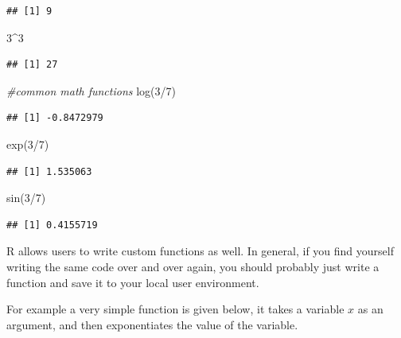 \documentclass[
]{article}
\newenvironment{Shaded}{\begin{snugshade}}{\end{snugshade}}
\newcommand{\CommentTok}[1]{\textcolor[rgb]{0.56,0.35,0.01}{\textit{#1}}}
\newcommand{\DecValTok}[1]{\textcolor[rgb]{0.00,0.00,0.81}{#1}}
\newcommand{\FunctionTok}[1]{\textcolor[rgb]{0.00,0.00,0.00}{#1}}
\newcommand{\NormalTok}[1]{#1}
\newcommand{\SpecialCharTok}[1]{\textcolor[rgb]{0.00,0.00,0.00}{#1}}
\begin{document}
\begin{verbatim}
## [1] 9
\end{verbatim}

\begin{Shaded}
\begin{Highlighting}[]
\DecValTok{3}\SpecialCharTok{\^{}}\DecValTok{3}
\end{Highlighting}
\end{Shaded}

\begin{verbatim}
## [1] 27
\end{verbatim}

\begin{Shaded}
\begin{Highlighting}[]
\CommentTok{\#common math functions}
\FunctionTok{log}\NormalTok{(}\DecValTok{3}\SpecialCharTok{/}\DecValTok{7}\NormalTok{)}
\end{Highlighting}
\end{Shaded}

\begin{verbatim}
## [1] -0.8472979
\end{verbatim}

\begin{Shaded}
\begin{Highlighting}[]
\FunctionTok{exp}\NormalTok{(}\DecValTok{3}\SpecialCharTok{/}\DecValTok{7}\NormalTok{)}
\end{Highlighting}
\end{Shaded}

\begin{verbatim}
## [1] 1.535063
\end{verbatim}

\begin{Shaded}
\begin{Highlighting}[]
\FunctionTok{sin}\NormalTok{(}\DecValTok{3}\SpecialCharTok{/}\DecValTok{7}\NormalTok{)}
\end{Highlighting}
\end{Shaded}

\begin{verbatim}
## [1] 0.4155719
\end{verbatim}

R allows users to write custom functions as well. In general, if you
find yourself writing the same code over and over again, you should
probably just write a function and save it to your local user
environment.

For example a very simple function is given below, it takes a variable
\(x\) as an argument, and then exponentiates the value of the variable.
\end{document}
